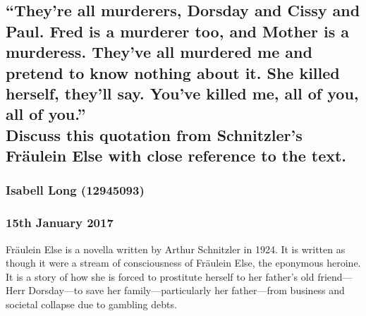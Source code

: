 \documentclass[12pt,a4paper]{article}
\begin{document}
\begin{center}
    \subsection*{``They're all murderers, Dorsday and Cissy and Paul. Fred
				 is a murderer too, and Mother is a murderess. They've all
				 murdered me and pretend to know nothing about it. She killed
			     herself, they'll say. You've killed me, all of you, all of
				 you.''\\
				 Discuss this quotation from Schnitzler's Fr\"{a}ulein Else
				 with close reference to the text.}
	\subsubsection*{Isabell Long (12945093)}
	\subsubsection*{15th January 2017}
\end{center}

Fr\"{a}ulein Else is a novella written by Arthur Schnitzler in 1924. It is written as though it were a stream of consciousness of Fr\"{a}ulein Else, the eponymous heroine. It is a story of how she is forced to prostitute herself to her father's old friend---Herr Dorsday---to save her family---particularly her father---from business and societal collapse due to gambling debts.\\
\end{document}
